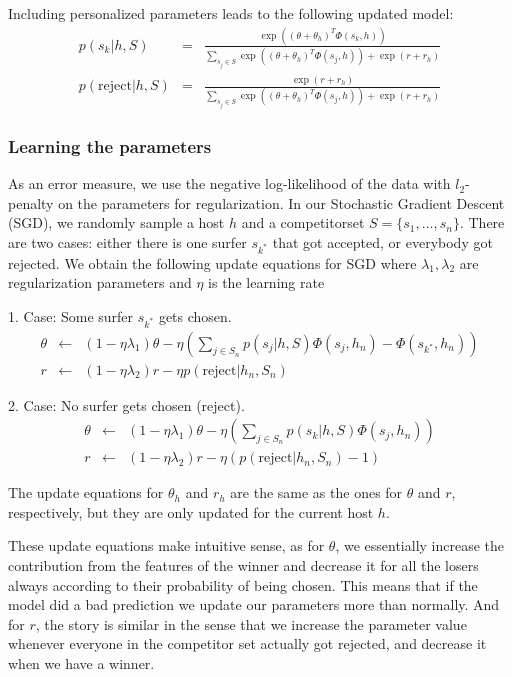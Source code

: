 Including personalized parameters leads to the following updated model:
\begin{eqnarray}
p(s_k | h, S) &=& \frac{\exp((\theta + \theta_h)^T \Phi(s_k,h))}{\sum_{s_j \in S} \exp((\theta + \theta_h)^T \Phi(s_j,h)) + \exp(r + r_{h})} \\
p(\text{reject} | h, S) &=& \frac{\exp(r+r_{h})}{\sum_{s_j \in S} \exp((\theta + \theta_h)^T \Phi(s_j,h)) + \exp(r + r_{h})}
\end{eqnarray}

\subsubsection{Learning the parameters}
As an error measure, we use the negative log-likelihood of the data with $l_2$-penalty on the parameters for regularization.
In our Stochastic Gradient Descent (SGD), we randomly sample a host $h$ and a competitorset $S=\{ s_1, \dots, s_n\}$.
There are two cases: either there is one surfer $s_{k^*}$ that got accepted, or everybody got rejected.
We obtain the following update equations for SGD where $\lambda_1, \lambda_2$ are regularization parameters and $\eta$ is the learning rate

1. Case: Some surfer $s_{k^*}$ gets chosen.
\begin{eqnarray}
\theta &\leftarrow& (1- \eta \lambda_1) \theta - \eta (\sum_{j \in S_n} p(s_j | h, S) \Phi(s_j,h_n) - \Phi(s_{k^*},h_n))\\
r &\leftarrow& (1- \eta \lambda_2) r - \eta p(\text{reject} | h_n, S_n)
\end{eqnarray}

2. Case: No surfer gets chosen (reject).
\begin{eqnarray}
\theta &\leftarrow& (1- \eta \lambda_1) \theta - \eta (\sum_{j \in S_n} p(s_k | h, S) \Phi(s_j,h_n))\\
r &\leftarrow& (1- \eta \lambda_2) r - \eta (p(\text{reject} | h_n, S_n)-1)
\end{eqnarray}

The update equations for $\theta_h$ and $r_h$ are the same as the ones for $\theta$ and $r$, respectively, but they are only updated for the current host $h$.

These update equations make intuitive sense, as for $\theta$, we essentially increase the contribution from the features of the winner and decrease it for all the losers always according to their probability of being chosen.
This means that if the model did a bad prediction we update our parameters more than normally.
And for $r$, the story is similar in the sense that we increase the parameter value whenever everyone in the competitor set actually got rejected, and decrease it when we have a winner.

